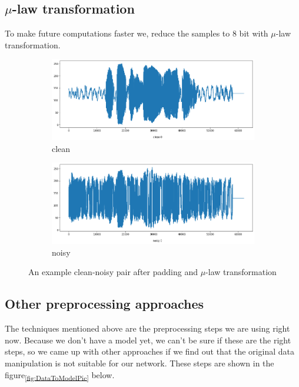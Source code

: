 \documentclass[12pt]{article}
\begin{document}
	\subsection{\boldmath$\mu$-law transformation} \label{mulaw}
	To make future computations faster we, reduce the samples to 8 bit with $\mu$-law transformation.
	
	\begin{figure}[H]
		\centering
		\begin{subfigure}{.5\textwidth}
			\centering
			\includegraphics[width=.8\linewidth]{wave_clean_padded_mulaw}
			\caption{clean}
			\label{fig:wave_clean_padded_mulaw}
		\end{subfigure}%
		\begin{subfigure}{.5\textwidth}
			\centering
			\includegraphics[width=.8\linewidth]{wave_noisy_padded_mulaw}
			\caption{noisy}
			\label{fig:wave_noisy_padded_mulaw}
		\end{subfigure}
		\caption{An example clean-noisy pair after padding and $\mu$-law transformation}
		\label{fig:clean_noisy_padded_mulaw}
	\end{figure}
	
	
	
	\subsection{Other preprocessing approaches}
	
	The techniques mentioned above are the preprocessing steps we are using right now. Because we don't have a model yet, we can't be sure if these are the right steps, so we came up with other approaches if we find out that the original data manipulation is not suitable for our network. These steps are shown in the figure\textsubscript{\ref{fig:DataToModelPic}} below.
	
\end{document}
